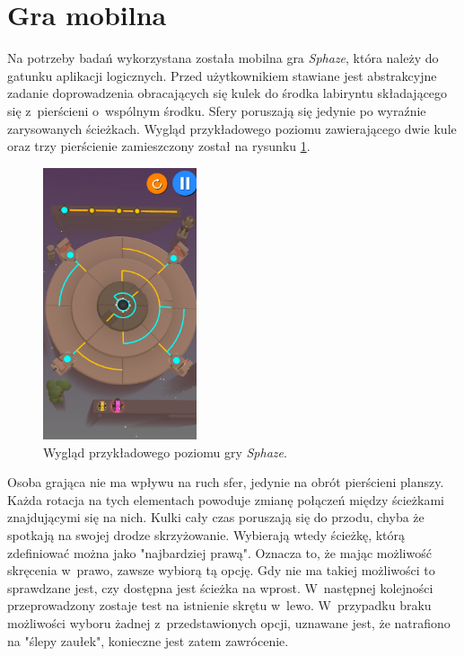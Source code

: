\documentclass[a4paper,12pt,numbers=noenddot]{report}
\begin{document}
\section{Gra mobilna}
Na potrzeby badań wykorzystana została mobilna gra \textit{Sphaze}, która należy do gatunku aplikacji logicznych. Przed użytkownikiem stawiane jest abstrakcyjne zadanie doprowadzenia obracających się kulek do środka labiryntu składającego się z~pierścieni o~wspólnym środku. Sfery poruszają się jedynie po wyraźnie zarysowanych ścieżkach. Wygląd przykładowego poziomu zawierającego dwie kule oraz trzy pierścienie zamieszczony został na rysunku \ref{fig:sphaze_1}.

\begin{figure}[h!]
	\centering
  	\includegraphics[height=8cm]{fig/twoBalls_threeRings.jpg}
	\caption{Wygląd przykładowego poziomu gry \textit{Sphaze}.}
	\label{fig:sphaze_1}
\end{figure}

Osoba grająca nie ma wpływu na ruch sfer, jedynie na obrót pierścieni planszy. Każda rotacja na tych elementach powoduje zmianę połączeń między ścieżkami znajdującymi się na nich. Kulki cały czas poruszają się do przodu, chyba że spotkają na swojej drodze skrzyżowanie. Wybierają wtedy ścieżkę, którą zdefiniować można jako "najbardziej prawą". Oznacza to, że mając możliwość skręcenia w~prawo, zawsze wybiorą tą opcję. Gdy nie ma takiej możliwości to sprawdzane jest, czy dostępna jest ścieżka na wprost. W~następnej kolejności przeprowadzony zostaje test na istnienie skrętu w~lewo. W~przypadku braku możliwości wyboru żadnej z~przedstawionych opcji, uznawane jest, że natrafiono na "ślepy zaułek", konieczne jest zatem zawrócenie.
\end{document}
